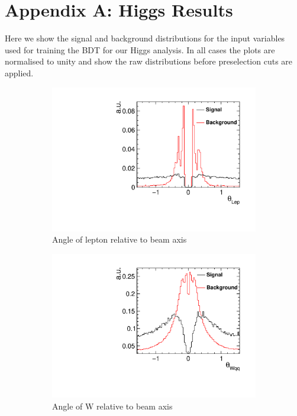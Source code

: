 \section{Appendix A: Higgs Results}
\label{appendixA}
Here we show the signal and background distributions for the input variables used for training the BDT for our Higgs analysis. In all cases the plots are normalised to unity and show the raw distributions before preselection cuts are applied.

\begin{figure}[h] 
  \begin{subfigure}[]{0.5\linewidth}
    \centering
    \includegraphics[width=0.75\linewidth]{Appendix/figures/DiraLep} 
    \caption{Angle of lepton relative to beam axis} 
    \vspace{4ex}
  \end{subfigure}%
  \begin{subfigure}[]{0.5\linewidth}
    \centering
    \includegraphics[width=0.75\linewidth]{Appendix/figures/DiraWqq} 
    \caption{Angle of W relative to beam axis} 
    \vspace{4ex}
  \end{subfigure}
    \begin{subfigure}[]{0.5\linewidth}

\end{subfigure}
\end{figure}
